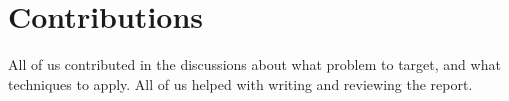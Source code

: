 \section{Contributions}
\label{contributions}
All of us contributed in the discussions about what problem to target,  and what techniques to apply.
All of us helped with writing and reviewing the report.
